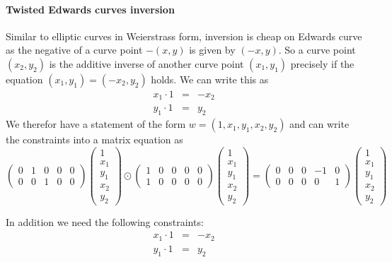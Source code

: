 \paragraph{Twisted Edwards curves inversion} Similar to elliptic curves in Weierstrass form, inversion is cheap on Edwards curve as the negative of a curve point $-(x,y)$ is given by $(-x,y)$. So a curve point $(x_2,y_2)$ is the additive inverse of another curve point $(x_1,y_1)$ precisely if the equation $(x_1,y_1) = (-x_2,y_2)$ holds. We can write this as
$$
\begin{array}{lcl}
x_1 \cdot 1 &=& -x_2 \\
y_1 \cdot 1 &=& y_2
\end{array}
$$
We therefor have a statement of the form $w=(1,x_1,y_1,x_2,y_2)$ and can write the constraints into a matrix equation as
$$
\begin{pmatrix}
0 & 1 & 0 & 0 & 0 \\
0 & 0 & 1 & 0 & 0
\end{pmatrix} \begin{pmatrix} 1 \\ x_1 \\ y_1 \\ x_2 \\ y_2 \end{pmatrix}\odot
\begin{pmatrix}
1 & 0 & 0 & 0 & 0\\
1 & 0 & 0 & 0 & 0
\end{pmatrix} \begin{pmatrix} 1 \\ x_1 \\ y_1 \\ x_2 \\ y_2 \end{pmatrix} =
\begin{pmatrix}
0 & 0 & 0 & -1 & 0\\
0 & 0 & 0 & 0 & 1
\end{pmatrix} \begin{pmatrix} 1 \\ x_1 \\ y_1 \\ x_2 \\ y_2 \end{pmatrix}
$$

In addition we need the following constraints:
$$
\begin{array}{lcl}
x_1 \cdot 1 &=& -x_2 \\
y_1 \cdot 1 &=& y_2
\end{array}
$$

